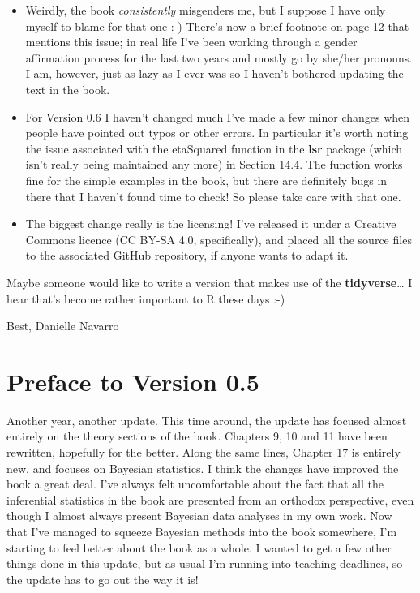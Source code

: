\documentclass[
]{book}
\providecommand{\tightlist}{%
  \setlength{\itemsep}{0pt}\setlength{\parskip}{0pt}}
\begin{document}
\begin{itemize}
\tightlist
\item
  Weirdly, the book \emph{consistently} misgenders me, but I suppose I have only myself to blame for that one :-) There's now a brief footnote on page 12 that mentions this issue; in real life I've been working through a gender affirmation process for the last two years and mostly go by she/her pronouns. I am, however, just as lazy as I ever was so I haven't bothered updating the text in the book.\\
\item
  For Version 0.6 I haven't changed much I've made a few minor changes when people have pointed out typos or other errors. In particular it's worth noting the issue associated with the etaSquared function in the \textbf{lsr} package (which isn't really being maintained any more) in Section 14.4. The function works fine for the simple examples in the book, but there are definitely bugs in there that I haven't found time to check! So please take care with that one.
\item
  The biggest change really is the licensing! I've released it under a Creative Commons licence (CC BY-SA 4.0, specifically), and placed all the source files to the associated GitHub repository, if anyone wants to adapt it.
\end{itemize}

Maybe someone would like to write a version that makes use of the \textbf{tidyverse}\ldots{} I hear that's become rather important to R these days :-)

Best,
Danielle Navarro

\hypertarget{preface-to-version-0.5}{%
\section{Preface to Version 0.5}\label{preface-to-version-0.5}}

Another year, another update. This time around, the update has focused almost entirely on the theory sections of the book. Chapters 9, 10 and 11 have been rewritten, hopefully for the better. Along the same lines, Chapter 17 is entirely new, and focuses on Bayesian statistics. I think the changes have improved the book a great deal. I've always felt uncomfortable about the fact that all the inferential statistics in the book are presented from an orthodox perspective, even though I almost always present Bayesian data analyses in my own work. Now that I've managed to squeeze Bayesian methods into the book somewhere, I'm starting to feel better about the book as a whole. I wanted to get a few other things done in this update, but as usual I'm running into teaching deadlines, so the update has to go out the way it is!
\end{document}
